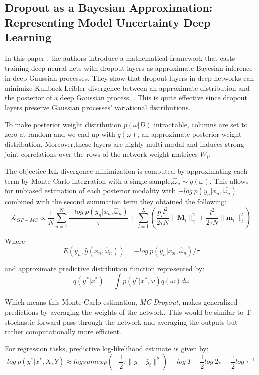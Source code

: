 \documentclass[11pt]{article}
\begin{document}
\subsection{Dropout as a Bayesian Approximation: Representing Model Uncertainty
	Deep Learning}
\par In this paper \cite{gal2016dropout}, the authors introduce a mathematical
framework that casts training deep neural nets with dropout layers as
approximate Bayesian inference in deep Gaussian processes. They show that dropout
layers in deep networks can minimize Kullback-Leibler divergence between an
approximate distribution and the posterior of a deep Gaussian process, \cite{damianou2013deep}.
This is quite effective since dropout layers preserve Gaussian processes'
variational distributions.

\par To make posterior weight distribution \(p(\omega|D)\) intractable, columns
are set to zero at random and we end up with \(q(\omega)\), an approximate
posterior weight distribution. Moreover,these layers are highly multi-modal and
induces strong joint correlations over the rows of the network weight matrices
\(W_i\).

\par The objectice KL divergence minimization is computed by approximating each
term by Monte Carlo integration with a single sample,\(\widehat{\omega}_n
\sim q(\omega)\).
This allows for unbiased estimation of each posterior modality with
\(-log~p(y_n | x_n,\widehat{\omega_n} ) \) combined with the second summation
term they obtained the following:
$$
	\mathcal{L}_{GP-MC} \propto\frac{1}{N}\sum_{n = 1}^{N}
	\frac{-log~p(y_n | x_n,\widehat{\omega}_n )}{ \tau }
	+ \sum_{l = 1}^{L} (\frac{p_i l^2}{2 \tau N} \|\textbf{M}_i\|_{2}^{2}
	+  \frac{l^2}{2 \tau N} \|\textbf{m}_i \|_{2}^{2})
$$

Where
$$
	E(y_n, \widehat{y}(x_n, \widehat{\omega}_{n})) = -log~p(y_n | x_n,\widehat{\omega}_n )/{ \tau}
$$

and approximate predictive distribution function represented by:
$$
	q(y^* | x^*) = \int p(y^* | x^*, \omega) q(\omega)d\omega
$$

Which means this Monte Carlo estimation, \textit{MC Dropout}, makes generalized
predictions by averaging the weights of the network. This would be similar to T
stochastic forward pass through the network and averaging the outputs but rather
computationally more efficient.

For regression tasks, predictive log-likelihood estimate is given by:
$$
	log~ p(y^* | x^*, X,Y)\approx  logsumexp(-\frac{1}{2} \tau \|y-\widehat{y}_t\|^2)
	- log~T - \frac{1}{2} log~ 2 \pi - \frac{1}{2} log~\tau^{-1}
$$
\end{document}
